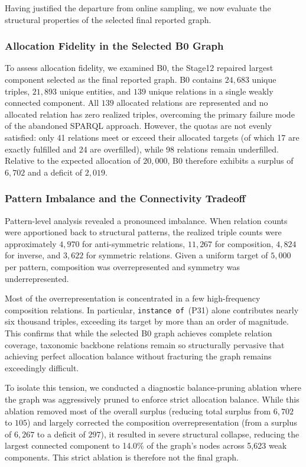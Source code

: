 \documentclass[12pt,a4paper]{article}
\begin{document}
Having justified the departure from online sampling, we now evaluate the structural properties of the selected final reported graph.

\subsubsection{Allocation Fidelity in the Selected B0 Graph}
To assess allocation fidelity, we examined B0, the Stage12 repaired largest component selected as the final reported graph. B0 contains \(24{,}683\) unique triples, \(21{,}893\) unique entities, and \(139\) unique relations in a single weakly connected component. All \(139\) allocated relations are represented and no allocated relation has zero realized triples, overcoming the primary failure mode of the abandoned SPARQL approach. However, the quotas are not evenly satisfied: only 41 relations meet or exceed their allocated targets (of which 17 are exactly fulfilled and 24 are overfilled), while 98 relations remain underfilled. Relative to the expected allocation of \(20{,}000\), B0 therefore exhibits a surplus of \(6{,}702\) and a deficit of \(2{,}019\).

\subsubsection{Pattern Imbalance and the Connectivity Tradeoff}
Pattern-level analysis revealed a pronounced imbalance. When relation counts were apportioned back to structural patterns, the realized triple counts were approximately \(4{,}970\) for anti-symmetric relations, \(11{,}267\) for composition, \(4{,}824\) for inverse, and \(3{,}622\) for symmetric relations. Given a uniform target of \(5{,}000\) per pattern, composition was overrepresented and symmetry was underrepresented. 

Most of the overrepresentation is concentrated in a few high-frequency composition relations. In particular, \texttt{instance of}~(P31) alone contributes nearly six thousand triples, exceeding its target by more than an order of magnitude. This confirms that while the selected B0 graph achieves complete relation coverage, taxonomic backbone relations remain so structurally pervasive that achieving perfect allocation balance without fracturing the graph remains exceedingly difficult.

To isolate this tension, we conducted a diagnostic balance-pruning ablation where the graph was aggressively pruned to enforce strict allocation balance. While this ablation removed most of the overall surplus (reducing total surplus from \(6{,}702\) to \(105\)) and largely corrected the composition overrepresentation (from a surplus of \(6{,}267\) to a deficit of \(297\)), it resulted in severe structural collapse, reducing the largest connected component to 14.0\% of the graph's nodes across 5,623 weak components. This strict ablation is therefore not the final graph.
\end{document}

